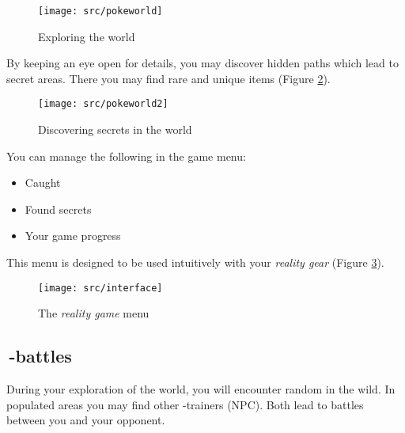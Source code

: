 \begin{figure}[!ht]
\begin{center}
\texttt{[image: src/pokeworld]}
\end{center}
\caption[Exploring the \pokeT{} world]{Exploring the \poke{} world}
\label{exploration}
\end{figure}

By keeping an eye open for details, you may discover hidden paths which lead to secret areas. There you may find rare \poke{} and unique items (Figure \ref{secrets}).

\begin{figure}[!ht]
\begin{center}
\texttt{[image: src/pokeworld2]}
\end{center}
\caption[Discovering secrets in the \pokeT{} world]{Discovering secrets in the \poke{} world}
\label{secrets}
\end{figure}

You can manage the following in the game menu:
\begin{itemize}
\item Caught \poke{}
\item Found secrets
\item Your game progress
\end{itemize}
This menu is designed to be used intuitively with your \emph{\poke{} reality gear} (Figure \ref{menu}).

\begin{figure}[!ht]
\begin{center}
\texttt{[image: src/interface]}
\end{center}
\caption[The \emph{\pokeT{} reality game} menu]{The \emph{\poke{} reality game} menu}
\label{menu}
\end{figure}

\subsection[\pokeT{}-battles]{\poke{}\,-battles}
During your exploration of the \poke{} world, you will encounter random \poke{} in the wild. In populated areas you may find other \poke{}-trainers (NPC). Both lead to \poke{} battles between you and your opponent.


